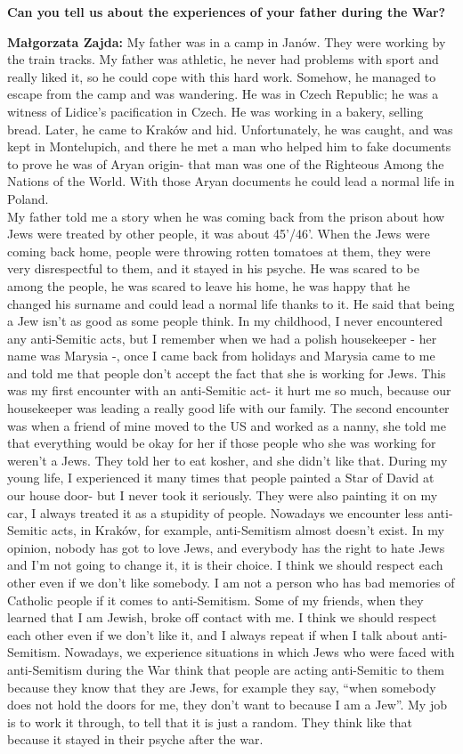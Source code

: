 \textbf{Can you tell us about the experiences of your father during the War?} 

\textbf{Małgorzata Zajda:} My father was in a camp in Janów. They were working by the train tracks. My father was athletic, he never had problems with sport and really liked it, so he could cope with this hard work. Somehow, he managed to escape from the camp and was wandering. He was in Czech Republic; he was a witness of Lidice's pacification in Czech. He was working in a bakery, selling bread. Later, he came to Kraków and hid. Unfortunately, he was caught, and was kept in Montelupich, and there he met a man who helped him to fake documents to prove he was of Aryan origin- that man was one of the Righteous Among the Nations of the World. With those Aryan documents he could lead a normal life in Poland. \\
My father told me a story when he was coming back from the prison about how Jews were treated by other people, it was about 45'/46'. When the Jews were coming back home, people were throwing rotten tomatoes at them, they were very disrespectful to them, and it stayed in his psyche. He was scared to be among the people, he was scared to leave his home, he was happy that he changed his surname and could lead a normal life thanks to it. He said that being a Jew isn't as good as some people think. In my childhood, I never encountered any anti-Semitic acts, but I remember when we had a polish housekeeper - her name was Marysia -, once I came back from holidays and Marysia came to me and told me that people don't accept the fact that she is working for Jews. This was my first encounter with an anti-Semitic act- it hurt me so much, because our housekeeper was leading a really good life with our family. The second encounter was when a friend of mine moved to the US and worked as a nanny, she told me that everything would be okay for her if those people who she was working for weren't a Jews. They told her to eat kosher, and she didn't like that. During my young life, I experienced it many times that people painted a Star of David at our house door- but I never took it seriously. They were also painting it on my car, I always treated it as a stupidity of people. Nowadays we encounter less anti-Semitic acts, in Kraków, for example, anti-Semitism almost doesn't exist. In my opinion, nobody has got to love Jews, and everybody has the right to hate Jews and I’m not going to change it, it is their choice. I think we should respect each other even if we don't like somebody. I am not a person who has bad memories of Catholic people if it comes to anti-Semitism. Some of my friends, when they learned that I am Jewish, broke off contact with me. I think we should respect each other even if we don't like it, and I always repeat if when I talk about anti-Semitism. Nowadays, we experience situations in which Jews who were faced with anti-Semitism during the War think that people are acting anti-Semitic to them because they know that they are Jews, for example they say, “when somebody does not hold the doors for me, they don't want to because I am a Jew”. My job is to work it through, to tell that it is just a random. They think like that because it stayed in their psyche after the war.  

